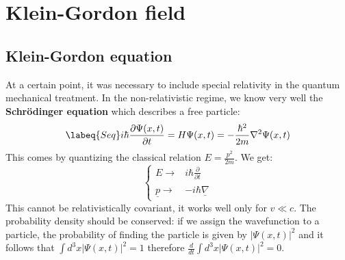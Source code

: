 \documentclass[../main.tex]{subfiles}
\begin{document}
\setchapterpreamble[u]{\margintoc}
\chapter[Klein-Gordon field]{Klein-Gordon field\footnotemark[0]}

\section{Klein-Gordon equation}
At a certain point, it was necessary to include special relativity in the quantum mechanical treatment. In the non-relativistic regime, we know very well the \textbf{Schr\"odinger equation} which describes a free particle:
\begin{equation}
\labeq{Seq}
i\hbar\frac{\partial\Psi(x,t)}{\partial t}=H\Psi(x,t)=-\frac{\hbar^2}{2m}\nabla^2\Psi(x,t)
\end{equation}
This comes by quantizing the classical relation $E=\frac{p^2}{2m}$. We get:
\[
\left\{
\begin{aligned}
E\xrightarrow[]{}&i\hbar\frac{\partial}{\partial t}\\
\underline{p}\xrightarrow[]{}&-i\hbar\underline{\nabla}
\end{aligned}
\right.
\]
This cannot be relativistically covariant, it works well only for $v\ll c$. The probability density should be conserved: if we assign the wavefunction to a particle, the probability of finding the particle is given by $|\Psi(x,t)|^2$ and it follows that $\int d^3x|\Psi(x,t)|^2=1$ therefore $\frac{d}{dt}\int d^3x|\Psi(x,t)|^2=0$.
\end{document}
